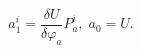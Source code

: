 \begin{equation}
a_{1}^{i}=\frac{\delta U}{\delta \varphi _{a}}P_{a}^{i},\;a_{0}=U.
\label{c12}
\end{equation}

